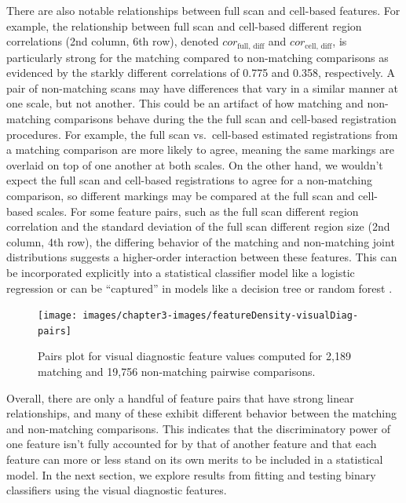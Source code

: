 \documentclass[11pt,]{isuthesis}
\begin{document}
There are also notable relationships between full scan and cell-based features.
For example, the relationship between full scan and cell-based different region correlations (2nd column, 6th row), denoted \(cor_{\text{full, diff}}\) and \(cor_{\text{cell, diff}}\), is particularly strong for the matching compared to non-matching comparisons as evidenced by the starkly different correlations of 0.775 and 0.358, respectively.
A pair of non-matching scans may have differences that vary in a similar manner at one scale, but not another.
This could be an artifact of how matching and non-matching comparisons behave during the the full scan and cell-based registration procedures.
For example, the full scan vs.~cell-based estimated registrations from a matching comparison are more likely to agree, meaning the same markings are overlaid on top of one another at both scales.
On the other hand, we wouldn't expect the full scan and cell-based registrations to agree for a non-matching comparison, so different markings may be compared at the full scan and cell-based scales.
For some feature pairs, such as the full scan different region correlation and the standard deviation of the full scan different region size (2nd column, 4th row), the differing behavior of the matching and non-matching joint distributions suggests a higher-order interaction between these features.
This can be incorporated explicitly into a statistical classifier model like a logistic regression or can be ``captured'' in models like a decision tree or random forest \citep{hastie_elements_2008}.

\begin{figure}[!htbp]

{\centering \texttt{[image: images/chapter3-images/featureDensity-visualDiag-pairs]} 

}

\caption{Pairs plot for visual diagnostic feature values computed for 2,189 matching and 19,756 non-matching pairwise comparisons.}\label{fig:visualFeaturePairs}
\end{figure}

Overall, there are only a handful of feature pairs that have strong linear relationships, and many of these exhibit different behavior between the matching and non-matching comparisons.
This indicates that the discriminatory power of one feature isn't fully accounted for by that of another feature and that each feature can more or less stand on its own merits to be included in a statistical model.
In the next section, we explore results from fitting and testing binary classifiers using the visual diagnostic features.
\end{document}
